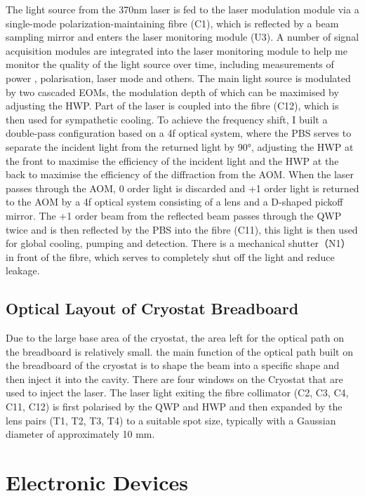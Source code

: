 The light source from the 370nm laser is fed to the laser modulation module via a single-mode polarization-maintaining fibre (C1), which is reflected by a beam sampling mirror and enters the laser monitoring module (U3). A number of signal acquisition modules are integrated into the laser monitoring module to help me monitor the quality of the light source over time, including measurements of power , polarisation, laser mode and others. The main light source is modulated by two cascaded EOMs, the modulation depth of which can be maximised by adjusting the HWP. Part of the laser is coupled into the fibre (C12), which is then used for sympathetic cooling. To achieve the frequency shift, I built a double-pass configuration based on a 4f optical system, where the PBS serves to separate the incident light from the returned light by 90°, adjusting the HWP at the front to maximise the efficiency of the incident light and the HWP at the back to maximise the efficiency of the diffraction from the AOM. When the laser passes through the AOM, 0 order light is discarded and +1 order light is returned to the AOM by a 4f optical system consisting of a lens and a D-shaped pickoff mirror. The +1 order beam from the reflected beam passes through the QWP twice and is then reflected by the PBS into the fibre (C11), this light is then used for global cooling, pumping and detection. There is a mechanical shutter（N1） in front of the fibre, which serves to completely shut off the light and reduce leakage.

\subsection{Optical Layout of Cryostat Breadboard}

Due to the large base area of the cryostat, the area left for the optical path on the breadboard is relatively small. the main function of the optical path built on the breadboard of the cryostat is to shape the beam into a specific shape and then inject it into the cavity. There are four windows on the Cryostat that are used to inject the laser. The laser light exiting the fibre collimator (C2, C3, C4, C11, C12) is first polarised by the QWP and HWP and then expanded by the lens pairs (T1, T2, T3, T4) to a suitable spot size, typically with a Gaussian diameter of approximately 10 mm.



\section{Electronic Devices}
